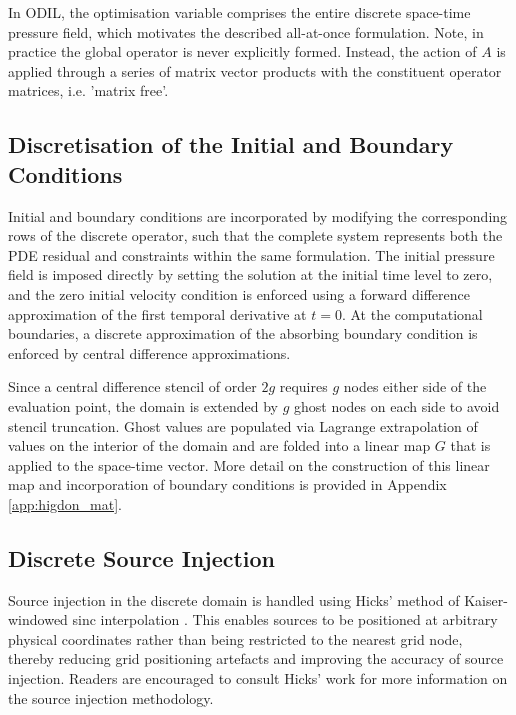 \documentclass[final-report]{report-template}
\begin{document}
In ODIL, the optimisation variable comprises the entire discrete space-time pressure field, which motivates the described all-at-once formulation. Note, in practice the global operator is never explicitly formed. Instead, the action of $A$ is applied through a series of matrix vector products with the constituent operator matrices, i.e. 'matrix free'. 

\subsection{Discretisation of the Initial and Boundary Conditions}
\label{subsubsect:disc_conditions}

Initial and boundary conditions are incorporated by modifying the corresponding rows of the discrete operator, such that the complete system represents both the PDE residual and constraints within the same formulation. The initial pressure field is imposed directly by setting the solution at the initial time level to zero, and the zero initial velocity condition is enforced using a forward difference approximation of the first temporal derivative at $t=0$. At the computational boundaries, a discrete approximation of the absorbing boundary condition is enforced by central difference approximations.

Since a central difference stencil of order $2g$ requires $g$ nodes either side of the evaluation point, the domain is extended by $g$ ghost nodes on each side to avoid stencil truncation. Ghost values are populated via Lagrange extrapolation of values on the interior of the domain and are folded into a linear map $G$ that is applied to the space-time vector. More detail on the construction of this linear map and incorporation of boundary conditions is provided in Appendix \ref{app:higdon_mat}.

\subsection{Discrete Source Injection}
\label{subsect:disc_source_inj}
Source injection in the discrete domain is handled using Hicks' method of Kaiser-windowed sinc interpolation \cite{hicksArbitrarySourceReceiver2002}. This enables sources to be positioned at arbitrary physical coordinates rather than being restricted to the nearest grid node, thereby reducing grid positioning artefacts and improving the accuracy of source injection. Readers are encouraged to consult Hicks' work for more information on the source injection methodology.
\end{document}

